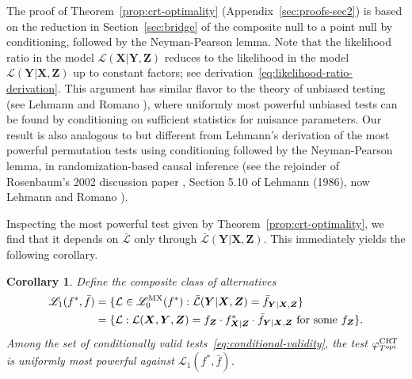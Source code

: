 \documentclass[ejs]{imsart}
\numberwithin{equation}{section}
\theoremstyle{plain}
\newtheorem{corollary}{Corollary}
\theoremstyle{definition}
\theoremstyle{remark}
\newcommand{\prx}{\bm X}
\newcommand{\prz}{\bm Z}
\newcommand{\pry}{{\bm Y}}
\def\CRT{\textnormal{CRT}}
\begin{document}
The proof of Theorem~\ref{prop:crt-optimality} (Appendix~\ref{sec:proofs-sec2}) is based on the reduction in Section~\ref{sec:bridge} of the composite null to a point null by conditioning, followed by the Neyman-Pearson lemma. Note that the likelihood ratio in the model $\mathcal L(\prx|\pry, \prz)$ reduces to the likelihood in the model $\mathcal L(\pry|\prx, \prz)$ up to constant factors; see derivation~\eqref{eq:likelihood-ratio-derivation}. This argument has similar flavor to the theory of unbiased testing (see Lehmann and Romano \cite[Chapter 4]{TSH}), where uniformly most powerful unbiased tests can be found by conditioning on sufficient statistics for nuisance parameters. Our result is also analogous to but different from Lehmann's derivation of the most powerful permutation tests using conditioning followed by the Neyman-Pearson lemma, in randomization-based causal inference (see the rejoinder of Rosenbaum's 2002 discussion paper \cite{Rosenbaum2002}, Section 5.10 of Lehmann (1986), now Lehmann and Romano \cite[Section 5.9]{TSH}).

Inspecting the most powerful test given by Theorem~\ref{prop:crt-optimality}, we find that it depends on $\bar{\mathcal L}$ only through $\bar{\mathcal L}(\pry|\prx,\prz)$. This immediately yields the following corollary.

\begin{corollary} \label{cor:crt-optimality}
	Define the composite class of alternatives
	\begin{equation*}
	\begin{split}
	\mathscr L_1(f^*, \bar f) &= \{\mathcal L \in \mathscr L_0^{\textnormal{MX}}(f^*): \bar{\mathcal L}(\pry|\prx,\prz) = \bar f_{\pry|\prx,\prz}\} \\
	&= \{\mathcal L: \mathcal L(\prx,\pry,\prz) = f_{\prz} \cdot f^*_{\prx|\prz} \cdot \bar f_{\pry|\prx,\prz} \textnormal{ for some } f_{\prz}\}.
	\end{split}
	\end{equation*}
	Among the set of conditionally valid tests~\eqref{eq:conditional-validity}, the test $\varphi^{\CRT}_{T^{\textnormal{opt}}}$ is uniformly most powerful against $\mathscr L_1(f^*, \bar f)$.
\end{corollary}
\end{document}
